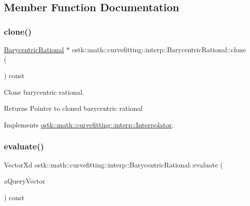 \subsection{Member Function Documentation}
\mbox{\label{classostk_1_1math_1_1curvefitting_1_1interp_1_1_barycentric_rational_a0fe27c0d93f957df0132354daa3e1368}} 
\subsubsection{\texorpdfstring{clone()}{clone()}}
{\footnotesize\ttfamily \hyperlink{classostk_1_1math_1_1curvefitting_1_1interp_1_1_barycentric_rational}{Barycentric\+Rational} $\ast$ ostk\+::math\+::curvefitting\+::interp\+::\+Barycentric\+Rational\+::clone (\begin{DoxyParamCaption}{ }\end{DoxyParamCaption}) const\hspace{0.3cm}{\ttfamily [virtual]}}



Clone barycentric rational. 

\begin{DoxyReturn}{Returns}
Pointer to cloned barycentric rational 
\end{DoxyReturn}


Implements \hyperlink{classostk_1_1math_1_1curvefitting_1_1interp_1_1_interpolator_a717dc5547d117cccd73506b75c40c66a}{ostk\+::math\+::curvefitting\+::interp\+::\+Interpolator}.

\mbox{\label{classostk_1_1math_1_1curvefitting_1_1interp_1_1_barycentric_rational_a4fbf8e51d6c5c383dca899b3e06fe043}} 
\subsubsection{\texorpdfstring{evaluate()}{evaluate()}\hspace{0.1cm}{\footnotesize\ttfamily [1/2]}}
{\footnotesize\ttfamily Vector\+Xd ostk\+::math\+::curvefitting\+::interp\+::\+Barycentric\+Rational\+::evaluate (\begin{DoxyParamCaption}\item[{const Vector\+Xd \&}]{a\+Query\+Vector }\end{DoxyParamCaption}) const\hspace{0.3cm}{\ttfamily [virtual]}}



